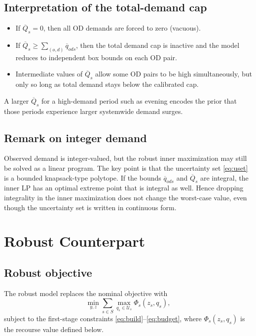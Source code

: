 \documentclass[11pt]{article}
\newcommand{\cU}{\mathcal{U}}
\theoremstyle{definition}
\begin{document}
\subsection{Interpretation of the total-demand cap}

\begin{itemize}
	\item If $\overline{Q}_s = 0$, then all OD demands are forced to zero (vacuous).
	\item If $\overline{Q}_s \ge \sum_{(o,d)} \overline{q}_{ods}$, then the total
	      demand cap is inactive and the model reduces to independent box bounds
	      on each OD pair.
	\item Intermediate values of $\overline{Q}_s$ allow some OD pairs to be high
	      simultaneously, but only so long as total demand stays below the
	      calibrated cap.
\end{itemize}

A larger $\overline{Q}_s$ for a high-demand period such as evening encodes the
prior that those periods experience larger systemwide demand surges.

\subsection{Remark on integer demand}

Observed demand is integer-valued, but the robust inner maximization may still
be solved as a linear program.  The key point is that the uncertainty set
\eqref{eq:uset} is a bounded knapsack-type polytope.  If the bounds
$\overline{q}_{ods}$ and $\overline{Q}_s$ are integral, the inner LP has an
optimal extreme point that is integral as well.  Hence dropping integrality in
the inner maximization does not change the worst-case value, even though the
uncertainty set is written in continuous form.

\section{Robust Counterpart}
\label{sec:robust-cpt}

\subsection{Robust objective}

The robust model replaces the nominal objective with
\begin{equation}
	\min_{y,z}
	\sum_{s \in S}
	\max_{q_s \in \cU_s}
	\Phi_s(z_s,q_s),
	\label{eq:robust-obj}
\end{equation}
subject to the first-stage constraints \eqref{eq:build}--\eqref{eq:budget},
where $\Phi_s(z_s, q_s)$ is the recourse value defined below.
\end{document}
